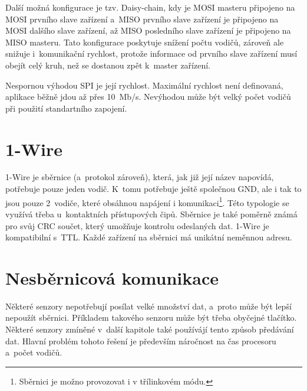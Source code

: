 Další možná konfigurace je tzv. Daisy-chain, kdy je  MOSI masteru připojeno na MOSI prvního slave zařízení a~MISO prvního slave zařízení je připojeno na MOSI dalšího slave zařízení, až MISO posledního slave zařízení je připojeno na MISO masteru.
Tato konfigurace poskytuje snížení počtu vodičů, zároveň ale snižuje i~komunikační rychlost, protože informace od prvního slave zařízení musí obejít celý kruh, než se dostanou zpět k~master zařízení.

Nespornou výhodou SPI je její rychlost.
Maximální rychlost není definovaná, aplikace běžně jdou až přes 10~Mb/s.
Nevýhodou může být velký počet vodičů při použití standartního zapojení.


\section{1-Wire}
1-Wire \cite{one-wire} je sběrnice (a~protokol zároveň), která, jak již její název napovídá, potřebuje pouze jeden vodič.
K~tomu potřebuje ještě společnou GND, ale i tak to jsou pouze 2~vodiče, které obsáhnou napájení i komunikaci\footnote{Sběrnici je možno provozovat i v třílinkovém módu.}.
Této typologie se využívá třeba u~kontaktních přístupových čipů.
Sběrnice je také poměrně známá pro svůj CRC součet, který umožňuje kontrolu odeslaných dat.
1-Wire je kompatibilní s~TTL.
Každé zařízení na sběrnici má unikátní neměnnou adresu.


\section{Nesběrnicová komunikace}
Některé senzory nepotřebují posílat velké množství dat, a~proto může být lepší nepoužít sběrnici. 
Příkladem takového senzoru může být třeba obyčejné tlačítko.
Některé senzory zmíněné v~další kapitole také používájí tento způsob předávání dat.
Hlavní problém tohoto řešení je především náročnost na čas procesoru a~počet vodičů.

